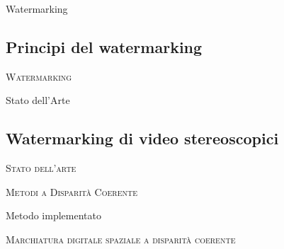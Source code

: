 \documentclass{beamer}
\begin{document}
\begin{section}{Watermarking}
\subsection {Principi del watermarking}
\begin{frame}[t]{\textsc{Watermarking}}

\end{frame}


\end{section}
\begin{section}{Stato dell'Arte}
\subsection{Watermarking di video stereoscopici}
\begin{frame}[t]{\textsc{Stato dell'arte}}

\end{frame}

\begin{frame}[t]{\textsc{Metodi a Disparit\`{a} Coerente}}
\end{frame}

\end{section}

\begin{section}{Metodo implementato}
\begin{frame}[t]{\textsc{Marchiatura digitale spaziale a disparit\`{a} coerente}}

\end{frame}
\end{section}
\end{document}
